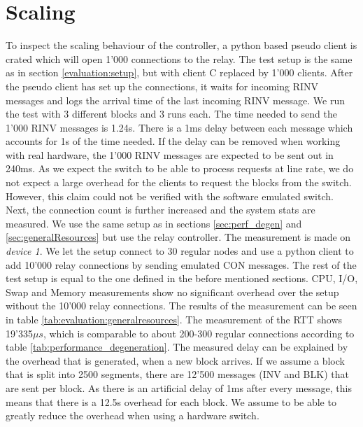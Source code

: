 

\section{Scaling \label{evaluation:scaling}}
To inspect the scaling behaviour of the controller, a python based pseudo client is crated which will open 1'000 connections to the relay. The test setup is the same as in section \ref{evaluation:setup}, but with client C replaced by 1'000 clients. After the pseudo client has set up the connections, it waits for incoming RINV messages and logs the arrival time of the last incoming RINV message. We run the test with 3 different blocks and 3 runs each. The time needed to send the 1'000 RINV messages is 1.24s. There is a 1ms delay between each message which accounts for 1s of the time needed. If the delay can be removed when working with real hardware, the 1'000 RINV messages are expected to be sent out in 240ms. As we expect the switch to be able to process requests at line rate, we do not expect a large overhead for the clients to request the blocks from the switch. However, this claim could not be verified with the software emulated switch.\\
Next, the connection count is further increased and the system stats are measured. We use the same setup as in sections \ref{sec:perf_degen} and \ref{sec:generalResources} but use the relay controller. The measurement is made on \textit{device 1}. We let the setup connect to 30 regular nodes  and use a python client to add 10'000 relay connections by sending emulated CON messages. The rest of the test setup is equal to the one defined in the before mentioned sections. CPU, I/O, Swap and Memory measurements show no significant overhead over the setup without the 10'000 relay connections. The results of the measurement can be seen in table \ref{tab:evaluation:generalresources}. The measurement of the RTT shows 19'335$\mu s$, which is comparable to about 200-300 regular connections according to table \ref{tab:performance_degeneration}. The measured delay can be explained by the overhead that is generated, when a new block arrives. If we assume a block that is split into 2500 segments, there are 12'500 messages (INV and BLK) that are sent per block. As there is an artificial delay of 1ms after every message, this means that there is a 12.5s overhead for each block. We assume to be able to greatly reduce the overhead when using a hardware switch.







